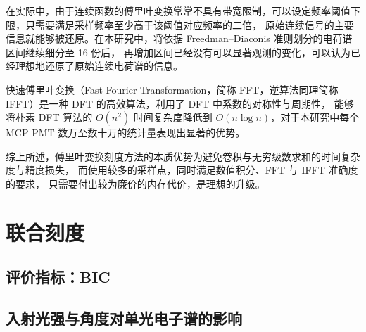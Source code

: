在实际中，由于连续函数的傅里叶变换常常不具有带宽限制，可以设定频率阈值下限，只需要满足采样频率至少高于该阈值对应频率的二倍，
原始连续信号的主要信息就能够被还原。在本研究中，将依据 Freedman–Diaconis 准则划分的电荷谱区间继续细分至 16 份后，
再增加区间已经没有可以显著观测的变化，可以认为已经理想地还原了原始连续电荷谱的信息。

快速傅里叶变换（Fast Fourier Transformation，简称 FFT，逆算法同理简称 IFFT）是一种 DFT 的高效算法，利用了 DFT 中系数的对称性与周期性，
能够将朴素 DFT 算法的 $O(n^2)$ 时间复杂度降低到 $O(n\log{n})$，对于本研究中每个 MCP-PMT 数万至数十万的统计量表现出显著的优势。

综上所述，傅里叶变换刻度方法的本质优势为避免卷积与无穷级数求和的时间复杂度与精度损失，
而使用较多的采样点，同时满足数值积分、FFT 与 IFFT 准确度的要求，
只需要付出较为廉价的内存代价，是理想的升级。

\section{联合刻度}

\subsection{评价指标：BIC}

\subsection{入射光强与角度对单光电子谱的影响}
